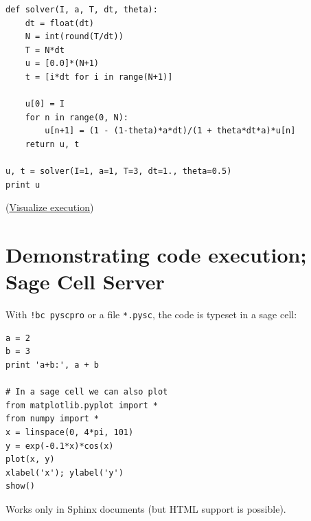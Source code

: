 \documentclass[%
twoside,                 %
final,                   %
chapterprefix=true,      %
open=right               %
10pt]{book}
\newenvironment{graybox1admon}[1][]{
\begin{graybox1mdframed}[frametitle=#1]
}
{
\end{graybox1mdframed}
}
\begin{document}
\begin{verbatim}
def solver(I, a, T, dt, theta):
    dt = float(dt)
    N = int(round(T/dt))
    T = N*dt
    u = [0.0]*(N+1)
    t = [i*dt for i in range(N+1)]

    u[0] = I
    for n in range(0, N):
        u[n+1] = (1 - (1-theta)*a*dt)/(1 + theta*dt*a)*u[n]
    return u, t

u, t = solver(I=1, a=1, T=3, dt=1., theta=0.5)
print u
\end{verbatim}
\noindent
(\href{{http://pythontutor.com/visualize.html\#code=def+solver\%28I\%2C+a\%2C+T\%2C+dt\%2C+theta\%29\%3A\%0A++++dt+\%3D+float\%28dt\%29\%0A++++N+\%3D+int\%28round\%28T\%2Fdt\%29\%29\%0A++++T+\%3D+N\%2Adt\%0A++++u+\%3D+\%5B0.0\%5D\%2A\%28N\%2B1\%29\%0A++++t+\%3D+\%5Bi\%2Adt+for+i+in+range\%28N\%2B1\%29\%5D\%0A\%0A++++u\%5B0\%5D+\%3D+I\%0A++++for+n+in+range\%280\%2C+N\%29\%3A\%0A++++++++u\%5Bn\%2B1\%5D+\%3D+\%281+-+\%281-theta\%29\%2Aa\%2Adt\%29\%2F\%281+\%2B+theta\%2Adt\%2Aa\%29\%2Au\%5Bn\%5D\%0A++++return+u\%2C+t\%0A\%0Au\%2C+t+\%3D+solver\%28I\%3D1\%2C+a\%3D1\%2C+T\%3D3\%2C+dt\%3D1.\%2C+theta\%3D0.5\%29\%0Aprint+u&mode=display&cumulative=false&heapPrimitives=false&drawParentPointers=false&textReferences=false&py=2&curInstr=0}}{Visualize execution}) 


\section*{Demonstrating code execution; Sage Cell Server}
\label{slide:sage:cell}

With \Verb~!bc pyscpro~ or a file \Verb!*.pysc!, the code is typeset in
a sage cell:

\begin{verbatim}
a = 2
b = 3
print 'a+b:', a + b

# In a sage cell we can also plot
from matplotlib.pyplot import *
from numpy import *
x = linspace(0, 4*pi, 101)
y = exp(-0.1*x)*cos(x)
plot(x, y)
xlabel('x'); ylabel('y')
show()
\end{verbatim}


\begin{graybox1admon}[Warning.]
Works only in Sphinx documents (but HTML support is possible).
\end{graybox1admon}
\end{document}
